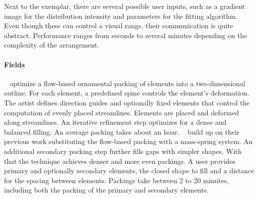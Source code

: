  Next to the exemplar, there are several possible user inputs, such as a gradient image for the distribution intensity and parameters for the fitting algorithm. Even though these can control a visual range, their communication is quite abstract. Performance ranges from seconds to several minutes depending on the complexity of the arrangement.


\paragraph*{Fields}
\label{para:analysis_element_arrangements_fields}

\citeauthor*{saputra_2017_ffo}~\cite{saputra_2017_ffo} optimize a flow-based ornamental packing of elements into a two-dimensional outline. For each element, a predefined spine controls the element's deformation. The artist defines direction guides and optionally fixed elements that control the computation of evenly placed streamlines. Elements are placed and deformed along streamlines. An iterative refinement step optimizes for a dense and balanced filling. An average packing takes about an hour. \citeauthor*{saputra_2018_rde}~\cite{saputra_2018_rde} build up on their previous work substituting the flow-based packing with a mass-spring system. An additional secondary packing step further fills gaps with simpler shapes. With that the technique achieves denser and more even packings. A user provides primary and optionally secondary elements, the closed shape to fill and a distance for the spacing between elements. Packings take between 2 to 20 minutes, including both the packing of the primary and secondary elements.

